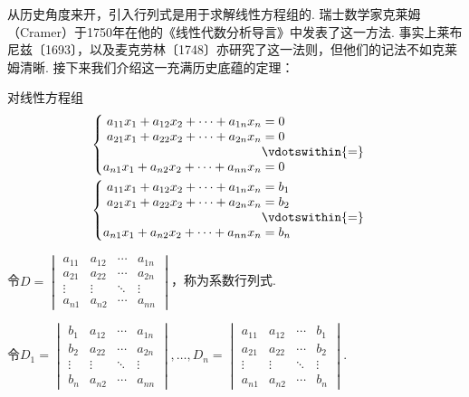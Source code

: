 从历史角度来开，引入行列式是用于求解线性方程组的. 瑞士数学家克莱姆（Cramer）于1750年在他的《线性代数分析导言》中发表了这一方法. 事实上莱布尼兹〔1693〕，以及麦克劳林〔1748〕亦研究了这一法则，但他们的记法不如克莱姆清晰. 接下来我们介绍这一充满历史底蕴的定理：
\begin{theorem} \label{thm:13:Cramer}
    对线性方程组
    \begin{gather}
        \label{eq:13:线性方程组1}
        \begin{cases} \begin{aligned}
                a_{11}x_1+a_{12}x_2+\cdots+a_{1n}x_n & = 0             \\
                a_{21}x_1+a_{22}x_2+\cdots+a_{2n}x_n & = 0             \\
                                                     & \vdotswithin{=} \\
                a_{n1}x_1+a_{n2}x_2+\cdots+a_{nn}x_n & = 0
            \end{aligned} \end{cases}
        \\
        \label{eq:13:线性方程组2}
        \begin{cases} \begin{aligned}
                a_{11}x_1+a_{12}x_2+\cdots+a_{1n}x_n & = b_1           \\
                a_{21}x_1+a_{22}x_2+\cdots+a_{2n}x_n & = b_2           \\
                                                     & \vdotswithin{=} \\
                a_{n1}x_1+a_{n2}x_2+\cdots+a_{nn}x_n & = b_n
            \end{aligned} \end{cases}
    \end{gather}

    令$D=\begin{vmatrix}
            a_{11} & a_{12} & \cdots & a_{1n} \\
            a_{21} & a_{22} & \cdots & a_{2n} \\
            \vdots & \vdots & \ddots & \vdots \\
            a_{n1} & a_{n2} & \cdots & a_{nn}
        \end{vmatrix}$，称为系数行列式.

    令$D_1=\begin{vmatrix}
            b_1    & a_{12} & \cdots & a_{1n} \\
            b_2    & a_{22} & \cdots & a_{2n} \\
            \vdots & \vdots & \ddots & \vdots \\
            b_n    & a_{n2} & \cdots & a_{nn}
        \end{vmatrix},\ldots,D_n=\begin{vmatrix}
            a_{11} & a_{12} & \cdots & b_1    \\
            a_{21} & a_{22} & \cdots & b_2    \\
            \vdots & \vdots & \ddots & \vdots \\
            a_{n1} & a_{n2} & \cdots & b_n
        \end{vmatrix}$.


\end{theorem}
